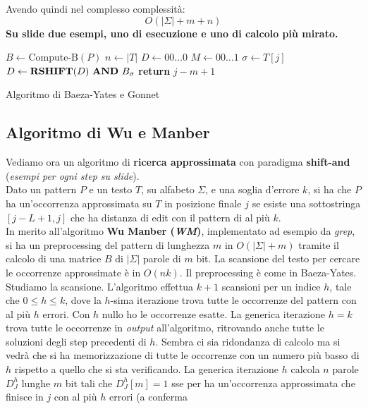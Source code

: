 Avendo quindi nel complesso complessità:
\[O(|\Sigma|+m+n)\]
\textbf{Su slide due esempi, uno di esecuzione e uno di calcolo più mirato.}
\begin{algorithm}
  \begin{algorithmic}
    \State $B\gets \mbox{Compute-B}(P)$
    \State $n\gets |T|$
    \State $D\gets 00\ldots 0$
    \State $M\gets 00\ldots 1$
    \State $\sigma\gets T[j]$
    \State $D\gets \mathbf{RSHIFT}(D)\mbox{ \textbf{AND} }B_\sigma$
    \State \textbf{return} $j-m+1$
    \EndIf
    \EndFor
    \EndFunction
  \end{algorithmic}
  \caption{Algoritmo di Baeza-Yates e Gonnet}
\end{algorithm}
\subsection{Algoritmo di Wu e Manber}
Vediamo ora un algoritmo di \textbf{ricerca approssimata} con paradigma
\textbf{shift-and} (\textit{esempi per ogni step su slide}).\\
Dato un pattern $P$ e un testo $T$, su alfabeto $\Sigma$, e una soglia d'errore
$k$, si ha che $P$ ha un'occorrenza approssimata su $T$ in posizione finale $j$
se esiste una sottostringa $[j-L+1,j]$ che ha distanza di edit con il pattern di
al più $k$.\\
In merito all'algoritmo \textbf{Wu Manber (\textit{WM})}, implementato ad
esempio da \textit{grep}, si ha un preprocessing del pattern di lunghezza $m$ in
$O(|\Sigma| +m)$ tramite il calcolo di una matrice $B$ di $|\Sigma|$ parole di
$m$ bit. La scansione del testo per cercare le occorrenze approssimate è in
$O(nk)$. Il preprocessing è come in Baeza-Yates.\\
Studiamo la scansione.
L'algoritmo effettua $k+1$ scansioni per un indice $h$, tale che $0\leq h\leq
k$, dove la $h$-sima iterazione trova tutte le occorrenze del pattern con al più
$h$ errori. Con $h$ nullo ho le occorrenze esatte. La generica iterazione $h=k$
trova tutte le occorrenze in \textit{output} all'algoritmo, ritrovando anche tutte le
soluzioni degli step precedenti di $h$. Sembra ci sia ridondanza di calcolo ma
si vedrà che si ha memorizzazione di tutte le occorrenze con un numero più basso
di $h$ rispetto a quello che si sta verificando. La generica iterazione $h$
calcola $n$ parole $D_J^h$ lunghe $m$ bit tali che $D_J^h[m]=1$ sse per ha
un'occorrenza approssimata che finisce in $j$ con al più $h$ errori (a conferma
